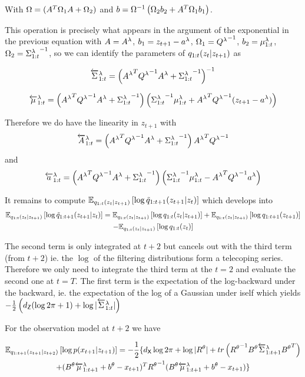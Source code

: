 \documentclass{article}
\begin{document}
With $\Omega = (A^T \Omega_1 A+ \Omega_2)$ and $b = {\Omega}^{-1}\left(\Omega_2 b_2 + A^T \Omega_1 b_1 \right)$.

This operation is precisely what appears in the argument of the exponential in the previous equation with $A = A^\lambda$, $b_1 = z_{t+1} - a^\lambda$, $\Omega_1 = {Q^\lambda}^{-1}$, $b_2 = \mu_{1:t}^\lambda$, $\Omega_2 = {\Sigma_{1:t}^\lambda}^{-1}$, so we can identify the parameters of $q_{1:t}(z_{t}|z_{t + 1})$ as 

$$\overleftarrow{\Sigma}_{1:t}^\lambda = {\left({A^\lambda}^T {Q^\lambda}^{-1} {A^\lambda} + {\Sigma_{1:t}^\lambda}^{-1}\right)}^{-1}$$

$$\overleftarrow{\mu}_{1:t}^\lambda = \left({A^\lambda}^T {Q^\lambda}^{-1} {A^\lambda} + {\Sigma_{1:t}^\lambda}^{-1}\right)\left({\Sigma_{1:t}^\lambda}^{-1}\mu_{1:t}^\lambda + {A^\lambda}^T {Q^\lambda}^{-1} (z_{t+1} - a^\lambda)\right)$$

Therefore we do have the linearity in $z_{t+1}$ with $$\overleftarrow{A}_{1:t}^\lambda = \left({A^\lambda}^T {Q^\lambda}^{-1} {A^\lambda} + {\Sigma_{1:t}^\lambda}^{-1}\right) {A^\lambda}^T {Q^\lambda}^{-1}$$ and $$\overleftarrow{a}_{1:t}^\lambda = \left({A^\lambda}^T {Q^\lambda}^{-1} {A^\lambda} + {\Sigma_{1:t}^\lambda}^{-1}\right)\left({\Sigma_{1:t}^\lambda}^{-1}\mu_{1:t}^\lambda - {A^\lambda}^T {Q^\lambda}^{-1} a^\lambda \right)$$


It remains to compute $\mathbb{E}_{q_{1:t}(z_{t}|z_{t + 1})}\left[\log \tilde{q}_{1:t+1}(z_{t+1}|z_t)\right]$ which develops into
\begin{multline*}
    \mathbb{E}_{q_{1:t}(z_{t}|z_{t + 1})}\left[\log \tilde{q}_{1:t+1}(z_{t+1}|z_t)\right]= \mathbb{E}_{q_{1:t}(z_{t}|z_{t + 1})}\left[\log q_{1:t}(z_{t}|z_{t + 1})\right] + \mathbb{E}_{q_{1:t}(z_{t}|z_{t + 1})}\left[\log q_{1:t+1}(z_{t+1})\right] \\ 
    - \mathbb{E}_{q_{1:t}(z_{t}|z_{t + 1})}\left[\log q_{1:t}(z_{t})\right]
\end{multline*}

The second term is only integrated at $t+2$ but cancels out with the third term (from $t+2$) ie. the $\log$ of the filtering distributions form a telecoping series. Therefore we only need to integrate the third term at the $t=2$ and evaluate the second one at $t=T$. The first term is the expectation of the log-backward under the backward, ie. the expectation of the log of a Gaussian under iself which yields $-\frac{1}{2}\left(d_{\mathsf{Z}}(\log 2\pi + 1) + \log |\overleftarrow{\Sigma}_{1:t}^\lambda|\right)$

For the observation model at $t+2$ we have

\begin{multline*}
\mathbb{E}_{q_{1:t+1}(z_{t+1}|z_{t+2})}\left[\log p(x_{t+1}|z_{t+1})\right] = -\frac{1}{2}\{d_{\mathsf{X}}\log 2\pi + \log |R^\theta| + tr\left({R^\theta}^{-1} B^\theta\overleftarrow{\Sigma}_{1:t+1}^\lambda{B^\theta}^T\right) \\ + (B^\theta\overleftarrow{\mu}_{1:t+1}^\lambda + b^\theta - x_{t+1})^T {R^\theta}^{-1} (B^\theta\overleftarrow{\mu}_{1:t+1}^\lambda + b^\theta - x_{t+1})\}
\end{multline*} 
\end{document}
